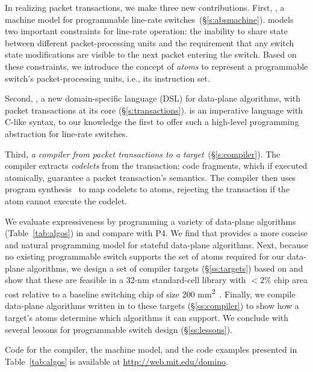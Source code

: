 In realizing packet transactions, we make three new contributions.  First, {\em
\absmachine}, a machine model for programmable line-rate
switches~(\S\ref{s:absmachine}).  \absmachine models two important constraints
for line-rate operation: the inability to share state between different
packet-processing units and the requirement that any switch state
modifications are visible to the next packet entering the switch. Based on
these constraints, we introduce the concept of {\em atoms} to represent a
programmable switch's packet-processing units, i.e., its instruction set.

Second, {\em \pktlanguage{}}, a new domain-specific language (DSL) for
data-plane algorithms, with packet transactions at its core
(\S\ref{s:transactions}).  \pktlanguage is an imperative language with C-like
syntax, to our knowledge the first to offer such a high-level programming
abstraction for line-rate switches.

Third, {\em a compiler from \pktlanguage packet transactions to a \absmachine
target}~(\S\ref{s:compiler}). The \pktlanguage compiler extracts {\em codelets}
from the transaction: code fragments, which if executed atomically, guarantee a
packet transaction's semantics. The compiler then uses program
synthesis~\cite{sketch_asplos} to map codelets to atoms, rejecting the
transaction if the atom cannot execute the codelet.


We evaluate expressiveness by programming a variety of data-plane algorithms
(Table~\ref{tab:algos}) in \pktlanguage and compare with P4. We find that
\pktlanguage provides a more concise and natural programming model for stateful
data-plane algorithms.  Next, because no existing programmable switch supports
the set of atoms required for our data-plane algorithms, we design a set of
compiler targets (\S\ref{ss:targets}) based on \absmachine and show that these
are feasible in a 32-nm standard-cell library with $< 2\%$ chip area cost
relative to a baseline switching chip of size 200
\si{\milli\metre\squared}~\cite{gibb_parsing}.  Finally, we compile data-plane
algorithms written in \pktlanguage to these targets (\S\ref{ss:compiler}) to
show how a target's atoms determine which algorithms it can support. We
conclude with several lessons for programmable switch design
(\S\ref{ss:lessons}).

Code for the \pktlanguage compiler, the \absmachine machine model, and the code
examples presented in Table~\ref{tab:algos} is available at
\url{http://web.mit.edu/domino}.
